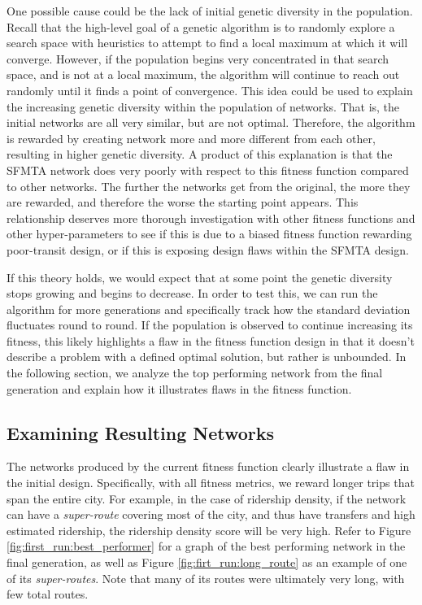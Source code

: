 \documentclass[11pt]{amsart}
\theoremstyle{definition}                  %
\theoremstyle{remark}                       %
\numberwithin{equation}{section}
\begin{document}
One possible cause could be the lack of initial genetic diversity in the population. Recall that the high-level goal of a genetic algorithm is to randomly explore a search space with heuristics to attempt to find a local maximum at which it will converge. However, if the population begins very concentrated in that search space, and is not at a local maximum, the algorithm will continue to reach out randomly until it finds a point of convergence. This idea could be used to explain the increasing genetic diversity within the population of networks. That is, the initial networks are all very similar, but are not optimal. Therefore, the algorithm is rewarded by creating network more and more different from each other, resulting in higher genetic diversity. A product of this explanation is that the SFMTA network does very poorly with respect to this fitness function compared to other networks. The further the networks get from the original, the more they are rewarded, and therefore the worse the starting point appears. This relationship deserves more thorough investigation with other fitness functions and other hyper-parameters to see if this is due to a biased fitness function rewarding poor-transit design, or if this is exposing design flaws within the SFMTA design.

If this theory holds, we would expect that at some point the genetic diversity stops growing and begins to decrease. In order to test this, we can run the algorithm for more generations and specifically track how the standard deviation fluctuates round to round. If the population is observed to continue increasing its fitness, this likely highlights a flaw in the fitness function design in that it doesn't describe a problem with a defined optimal solution, but rather is unbounded. In the following section, we analyze the top performing network from the final generation and explain how it illustrates flaws in the fitness function. 

\subsection{Examining Resulting Networks}

The networks produced by the current fitness function clearly illustrate a flaw in the initial design. Specifically, with all fitness metrics, we reward longer trips that span the entire city. For example, in the case of ridership density, if the network can have a \textit{super-route} covering most of the city, and thus have transfers and high estimated ridership, the ridership density score will be very high. Refer to Figure \ref{fig:first_run:best_performer} for a graph of the best performing network in the final generation, as well as Figure \ref{fig:firt_run:long_route} as an example of one of its \textit{super-routes}. Note that many of its routes were ultimately very long, with few total routes. 
\end{document}
